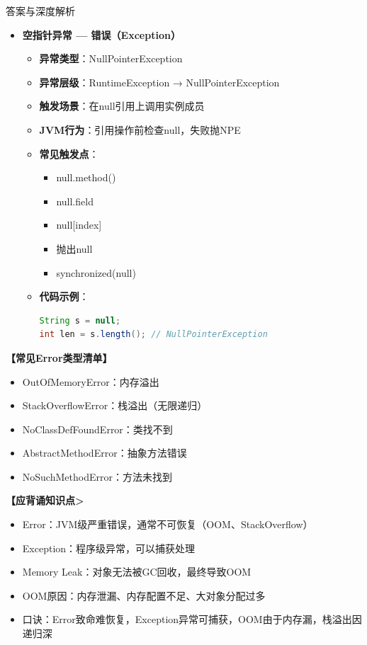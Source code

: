 \documentclass[12pt, a4paper]{ctexart}
\begin{document}
\begin{enumerate}[label=\textbf{\arabic*.}]
\begin{bluebox}{答案与深度解析}
\begin{itemize}[leftmargin=*, nosep, label={}]
			      \item[D] \textbf{空指针异常 — 错误（Exception）}
			            \begin{itemize}[label={}, leftmargin=*, nosep]
				            \item \textbf{异常类型}：NullPointerException
				            \item \textbf{异常层级}：RuntimeException → NullPointerException
				            \item \textbf{触发场景}：在null引用上调用实例成员
				            \item \textbf{JVM行为}：引用操作前检查null，失败抛NPE
				            \item \textbf{常见触发点}：
				                  \begin{itemize}[label={}, nosep]
					                  \item null.method()
					                  \item null.field
					                  \item null[index]
					                  \item 抛出null
					                  \item synchronized(null)
				                  \end{itemize}
				            \item \textbf{代码示例}：
				                  \begin{lstlisting}[language=Java]
String s = null;
int len = s.length(); // NullPointerException
				            \end{lstlisting}
			            \end{itemize}
		      \end{itemize}

		      \textbf{【常见Error类型清单】}
		      \begin{itemize}[label={}, nosep]
			      \item OutOfMemoryError：内存溢出
			      \item StackOverflowError：栈溢出（无限递归）
			      \item NoClassDefFoundError：类找不到
			      \item AbstractMethodError：抽象方法错误
			      \item NoSuchMethodError：方法未找到
		      \end{itemize}

		      \textbf{【应背诵知识点>}
		      \begin{itemize}[label={}, nosep]
			      \item Error：JVM级严重错误，通常不可恢复（OOM、StackOverflow）
			      \item Exception：程序级异常，可以捕获处理
			      \item Memory Leak：对象无法被GC回收，最终导致OOM
			      \item OOM原因：内存泄漏、内存配置不足、大对象分配过多
			      \item 口诀：Error致命难恢复，Exception异常可捕获，OOM由于内存漏，栈溢出因递归深
		      \end{itemize}


\end{bluebox}
\end{enumerate}
\end{document}
